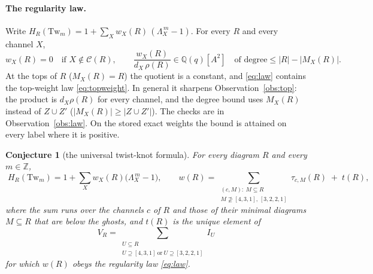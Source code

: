 \documentclass[11pt]{article}
\newtheorem{conjecture}{Conjecture}
\newcommand{\Tw}{\mathrm{Tw}}
\newcommand{\Lam}{\Lambda}
\newcommand{\Chan}{\mathcal C}
\begin{document}
\paragraph{The regularity law.}  Write $H_R(\Tw_m)=1+\sum_Xw_X(R)\,(\Lam_X^{\,m}-1)$.  For every $R$ and every channel $X$,
\begin{equation}\label{eq:law}
w_X(R)=0\quad\text{if }X\notin\Chan(R),\qquad
\frac{w_X(R)}{d_X\,\rho(R)}\in\mathbb Q(q)[A^2]\quad\text{of degree}\le|R|-|M_X(R)|.
\end{equation}
At the tops of $R$ ($M_X(R)=R$) the quotient is a constant, and \eqref{eq:law} contains the top-weight law
\eqref{eq:topweight}.  In general it sharpens Observation~\ref{obs:top}: the product is $d_X\rho(R)$ for every channel, and
the degree bound uses $M_X(R)$ instead of $Z\cup Z'$ ($|M_X(R)|\ge|Z\cup Z'|$).  The checks are in
Observation~\ref{obs:law}.  On the stored exact weights the bound is attained on every label where it is positive.

\begin{conjecture}[the universal twist-knot formula]\label{conj:final}
For every diagram $R$ and every $m\in\mathbb Z$,
\begin{equation}\label{eq:final}
\boxed{\;H_R(\Tw_m)=1+\sum_Xw_X(R)\bigl(\Lam_X^{\,m}-1\bigr),\qquad
w(R)=\sum_{\substack{(c,M):\ M\subseteq R\\ M\not\supseteq[4,3,1],\,[3,2,2,1]}}\tau_{c,M}(R)\;+\;t(R),\;}
\end{equation}
where the sum runs over the channels $c$ of $R$ and those of their minimal diagrams $M\subseteq R$ that are below the
ghosts, and $t(R)$ is the unique element of
\[
V_R=\sum_{\substack{U\subseteq R\\ U\supseteq[4,3,1]\ \text{or}\ U\supseteq[3,2,2,1]}}I_U
\]
for which $w(R)$ obeys the regularity law \eqref{eq:law}.
\end{conjecture}
\end{document}
